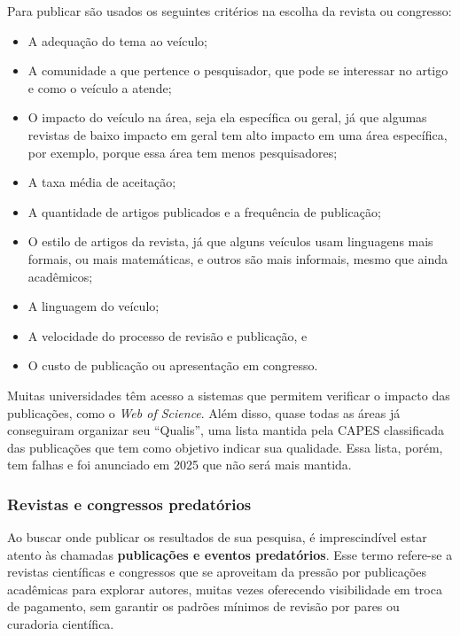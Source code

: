 Para publicar são usados os seguintes critérios na escolha da revista ou congresso:
\begin{itemize}
    \item A adequação do tema ao veículo;
    \item A comunidade a que pertence o pesquisador, que pode se interessar no artigo e como o veículo a atende;
    \item O impacto do veículo na área, seja ela específica ou geral, já que algumas revistas de baixo impacto em geral tem alto impacto em uma área específica, por exemplo, porque essa área tem menos pesquisadores;
    \item A taxa média de aceitação;
    \item A quantidade de artigos publicados e a frequência de publicação;
    \item O estilo de artigos da revista, já que alguns veículos usam linguagens mais formais, ou mais matemáticas, e outros são mais informais, mesmo que ainda acadêmicos;
    \item A linguagem do veículo;
    \item A velocidade do processo de revisão e publicação, e
    \item O custo de publicação ou apresentação em congresso.
\end{itemize}


Muitas universidades têm acesso a sistemas que permitem verificar o impacto das publicações, como o \textit{Web of Science}. Além disso, quase todas as áreas já conseguiram organizar seu ``Qualis'', uma lista mantida pela CAPES classificada das publicações que tem como objetivo indicar sua qualidade. Essa lista, porém, tem falhas e foi anunciado em 2025 que não será mais mantida.


\subsubsection{Revistas e congressos predatórios}

Ao buscar onde publicar os resultados de sua pesquisa, é imprescindível estar atento às chamadas \textbf{publicações e eventos predatórios}.
Esse termo refere-se a revistas científicas e congressos que se aproveitam da pressão por publicações acadêmicas para explorar autores, muitas vezes oferecendo visibilidade em troca de pagamento, sem garantir os padrões mínimos de revisão por pares ou curadoria científica.

